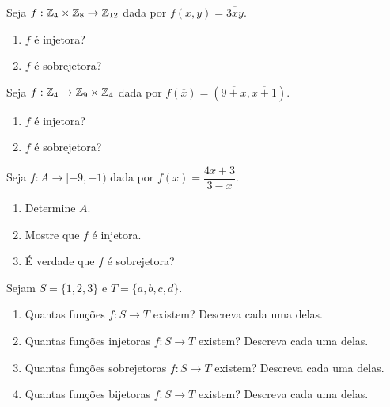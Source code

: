 \documentclass[12pt]{exam}
\begin{document}
    \vspace{.3cm}

    \questao{} Seja $f: \mathbb{Z}_4 \times \mathbb{Z}_8 \to \mathbb{Z}_{12}$ dada por $f(\overline{x},\overline{y}) = \overline{3xy}$.
    \begin{enumerate}[label={\alph*})]
        \item $f$ é injetora?

        \item $f$ é sobrejetora?
    \end{enumerate}

    \vspace{.3cm}

    \questao{} Seja $f: \mathbb{Z}_4 \to \mathbb{Z}_9 \times \mathbb{Z}_4$ dada por $f(\overline{x}) = (\overline{9 + x},\overline{x+1})$.
    \begin{enumerate}[label={\alph*})]
        \item $f$ é injetora?

        \item $f$ é sobrejetora?
    \end{enumerate}

    \vspace{.3cm}

    \questao{} Seja $f : A \to [-9,-1)$ dada por $f(x) = \dfrac{4x + 3}{3 - x}$.
    \begin{enumerate}[label={\alph*})]
        \item Determine $A$.

        \item Mostre que $f$ é injetora.

        \item É verdade que $f$ é sobrejetora?
    \end{enumerate}

    \vspace{.3cm}

    \questao{} Sejam $S = \{1, 2, 3\}$ e $T = \{a, b, c, d\}$.
    \begin{enumerate}[label={\alph*})]
        \item Quantas funções $f : S \to T$ existem? Descreva cada uma delas.

        \item Quantas funções injetoras $f : S \to T$ existem? Descreva cada uma delas.

        \item Quantas funções sobrejetoras $f : S \to T$ existem? Descreva cada uma delas.

        \item Quantas funções bijetoras $f : S \to T$ existem? Descreva cada uma delas.
    \end{enumerate}
\end{document}
